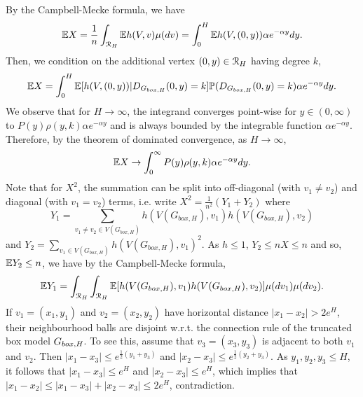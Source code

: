 By the Campbell-Mecke formula, we have
\begin{align*}
\mathbb{E} X = \frac{1}{n}\int_{{\mathcal R}_H} \mathbb{E} h(V,v) \mu(dv) = \int_0^H \mathbb{E} h(V,(0,y))\alpha e^{-\alpha y} dy.
\end{align*}
Then, we condition on the additional vertex $(0,y) \in {\mathcal R}_H$ having degree $k$,
\begin{align*}
\mathbb{E} X = \int_0^H \mathbb{E}[h(V,(0,y))|D_{G_{box,H}}(0,y)=k]\mathbb{P}(D_{G_{box,H}}(0,y)=k)\alpha e^{-\alpha y}dy.
\end{align*}
We observe that for $H \rightarrow \infty$, the integrand converges point-wise for $y \in (0,\infty)$ to $P(y)\rho(y,k)\alpha e^{-\alpha y}$ and is always bounded by the integrable function $\alpha e^{-\alpha y}$.
Therefore, by the theorem of dominated convergence, as $H \rightarrow \infty$,
\begin{align*}
\mathbb{E} X \rightarrow \int_0^\infty P(y)\rho(y,k)\alpha e^{-\alpha y}dy.
\end{align*}
Note that for $X^2$, the summation can be split into off-diagonal (with $v_1 \not = v_2$) and diagonal (with $v_1=v_2$) terms, i.e. write $X^2 = \frac{1}{n^2}(Y_1+Y_2)$ where 
$$Y_1 = \sum_{v_1 \not = v_2 \in V(G_{box,H})} h(V(G_{box,H}),v_1)h(V(G_{box,H}),v_2)$$ and $Y_2 = \sum_{v_1 \in V(G_{box,H})} h(V(G_{box,H}),v_1)^2$. As $h \leq 1$, $Y_2 \leq n X\leq n$ and so, $\mathbb{E} Y_2 \leq n$, we have by the Campbell-Mecke formula,
\begin{align*}
\mathbb{E} Y_1 = \int_{{\mathcal R}_H} \int_{{\mathcal R}_H} \mathbb{E}[h(V(G_{box,H}),v_1)h(V(G_{box,H}),v_2)]\mu(dv_1)\mu(dv_2).
\end{align*}
If $v_1=(x_1,y_1)$ and $v_2=(x_2,y_2)$ have horizontal distance $|x_1-x_2|>2e^H$, their neighbourhood balls are disjoint w.r.t. the connection rule of the truncated box model $G_{box,H}$. To see this, assume that $v_3=(x_3,y_3)$ is adjacent to both $v_1$ and $v_2$. Then $|x_1-x_3|\leq e^{\frac{1}{2}(y_1+y_3)}$ and $|x_2-x_3|\leq e^{\frac{1}{2}(y_2+y_3)}$. As $y_1, y_2, y_3 \leq H$, it follows that $|x_1-x_3| \leq e^H$ and $|x_2-x_3|\leq e^H$, which implies that $|x_1-x_2| \leq |x_1-x_3|+|x_2-x_3|\leq 2e^H$, contradiction.

